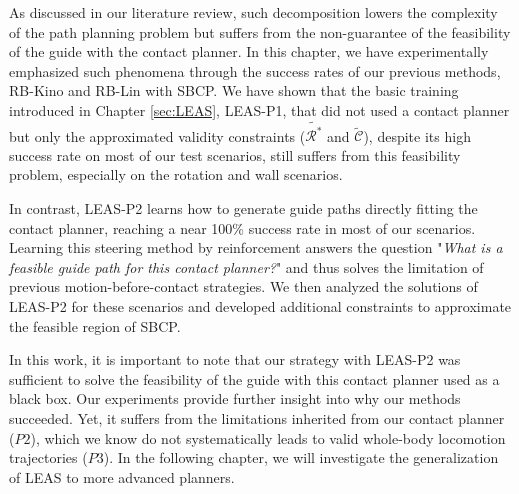 As discussed in our literature review, such decomposition lowers the complexity of the path planning problem but suffers from the non-guarantee of the feasibility of the guide with the contact planner.
In this chapter, we have experimentally emphasized such phenomena through the success rates of our previous methods, RB-Kino and RB-Lin with SBCP.
We have shown that the basic training introduced in Chapter \ref{sec:LEAS}, LEAS-P1, that did not used a contact planner but only the approximated validity constraints ($\tilde{\mathcal{R}^*}$ and $\tilde{\mathcal{C}}$), despite its high success rate on most of our test scenarios, still suffers from this feasibility problem, especially on the rotation and wall scenarios.

In contrast, LEAS-P2 learns how to generate guide paths directly fitting the contact planner, reaching a near 100\% success rate in most of our scenarios. Learning this steering method by reinforcement answers the question "\textit{What is a feasible guide path for this contact planner?}" and thus solves the limitation of previous motion-before-contact strategies.
We then analyzed the solutions of LEAS-P2 for these scenarios and developed additional constraints to approximate the feasible region of SBCP.

In this work, it is important to note that our strategy with LEAS-P2 was sufficient to solve the feasibility of the guide with this contact planner used as a black box.
Our experiments provide further insight into why our methods succeeded.
Yet, it suffers from the limitations inherited from our contact planner ($P2$), which we know do not systematically leads to valid whole-body locomotion trajectories ($P3$).
In the following chapter, we will investigate the generalization of LEAS to more advanced planners.

